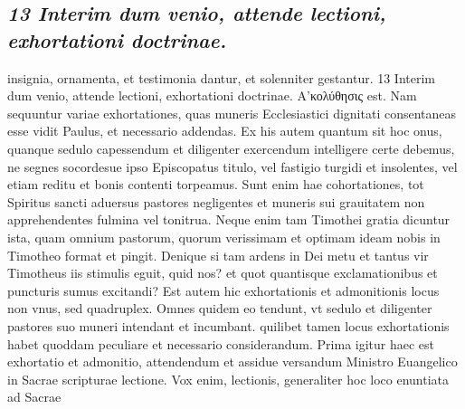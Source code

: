 \documentclass{article}
\begin{document}
\begin{pages}
\subsection*{\textit{13 Interim dum venio, attende lectioni, exhortationi doctrinae.}}insignia, ornamenta, et testimonia dantur, et solenniter gestantur. 13 Interim dum venio, attende lectioni, exhortationi doctrinae. Α’κολύθησις est. Nam sequuntur variae exhortationes, quas muneris Ecclesiastici dignitati consentaneas esse vidit Paulus, et necessario addendas. Ex his autem quantum sit hoc onus, quanque sedulo capessendum et diligenter exercendum intelligere certe debemus, ne segnes socordesue ipso Episcopatus titulo, vel fastigio turgidi et insolentes, vel etiam reditu et bonis contenti torpeamus. Sunt enim hae cohortationes, tot Spiritus sancti aduersus pastores negligentes et muneris sui grauitatem non apprehendentes fulmina vel tonitrua. Neque enim tam Timothei gratia dicuntur ista, quam omnium pastorum, quorum verissimam et optimam ideam nobis in Timotheo format et pingit. Denique si tam ardens in Dei metu et tantus vir Timotheus iis stimulis eguit, quid nos? et quot quantisque exclamationibus et puncturis sumus excitandi? Est autem hic exhortationis et admonitionis locus non vnus, sed quadruplex. Omnes quidem eo tendunt, vt sedulo et diligenter pastores suo muneri intendant et incumbant. quilibet tamen locus exhortationis habet quoddam peculiare et necessario considerandum. Prima igitur haec est exhortatio et admonitio, attendendum et assidue versandum Ministro Euangelico in Sacrae scripturae lectione. Vox enim, lectionis, generaliter hoc loco enuntiata ad Sacrae  \pend

\end{pages}
\end{document}
